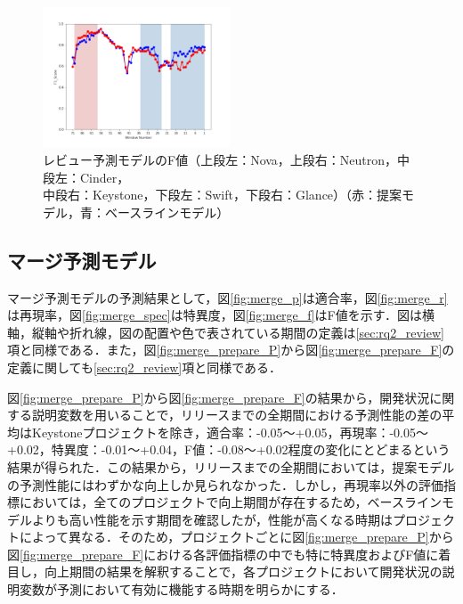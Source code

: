 \documentclass[submit]{ipsj}
\begin{document}
\begin{figure}[t]
\begin{center}
    \includegraphics[width=0.495\textwidth]{Uenaka_fig/RQ2_result/Glance/Glance_review_F1.pdf}
    \caption{レビュー予測モデルのF値（上段左：Nova，上段右：Neutron，中段左：Cinder，\\ 中段右：Keystone，下段左：Swift，下段右：Glance）（赤：提案モデル，青：ベースラインモデル）}
    \label{fig:review_f}
\end{center}
\end{figure}


\subsection{マージ予測モデル}
マージ予測モデルの予測結果として，図\ref{fig:merge_p}は適合率，図\ref{fig:merge_r}は再現率，図\ref{fig:merge_spec}は特異度，図\ref{fig:merge_f}はF値を示す．図は横軸，縦軸や折れ線，図の配置や色で表されている期間の定義は\ref{sec:rq2_review}項と同様である．また，図\ref{fig:merge_prepare_P}から図\ref{fig:merge_prepare_F}の定義に関しても\ref{sec:rq2_review}項と同様である．

図\ref{fig:merge_prepare_P}から図\ref{fig:merge_prepare_F}の結果から，開発状況に関する説明変数を用いることで，リリースまでの全期間における予測性能の差の平均はKeystoneプロジェクトを除き，適合率：-0.05〜+0.05，再現率：-0.05〜+0.02，特異度：-0.01〜+0.04，F値：-0.08〜+0.02程度の変化にとどまるという結果が得られた．この結果から，リリースまでの全期間においては，提案モデルの予測性能にはわずかな向上しか見られなかった．しかし，再現率以外の評価指標においては，全てのプロジェクトで向上期間が存在するため，ベースラインモデルよりも高い性能を示す期間を確認したが，性能が高くなる時期はプロジェクトによって異なる．そのため，プロジェクトごとに図\ref{fig:merge_prepare_P}から図\ref{fig:merge_prepare_F}における各評価指標の中でも特に特異度およびF値に着目し，向上期間の結果を解釈することで，各プロジェクトにおいて開発状況の説明変数が予測において有効に機能する時期を明らかにする．
\end{document}
